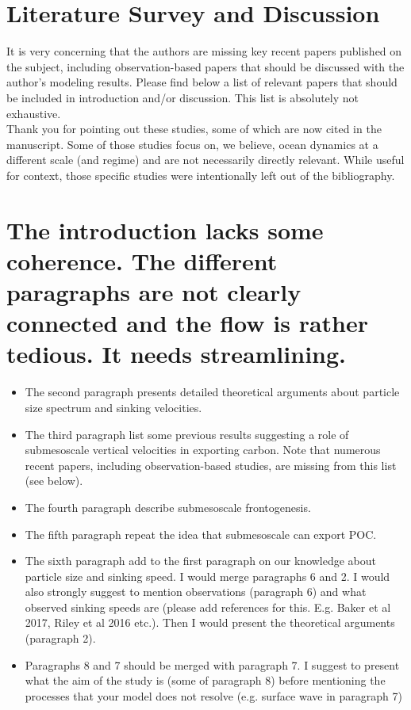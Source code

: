 \documentclass[12pt,letter]{article}
\begin{document}
\section*{Literature Survey and Discussion}
It is very concerning that the authors are missing key recent papers published on the subject, including observation-based papers that should be discussed with the author's modeling results. Please find below a list of relevant papers that should be included in introduction and/or discussion. This list is absolutely not exhaustive.\\

{\color{blue} Thank you for pointing out these studies, some of which are now cited in the manuscript. Some of those studies focus on, we believe, ocean dynamics at a different scale (and regime) and are not necessarily directly relevant. While useful for context, those specific studies were intentionally left out of the bibliography.\\}


\section*{The introduction lacks some coherence. The different paragraphs are not clearly connected and the flow is rather tedious. It needs streamlining. }
\begin{itemize}
	\item	The second paragraph presents detailed theoretical arguments about particle size spectrum and sinking velocities.
	\item	The third paragraph list some previous results suggesting a role of submesoscale vertical velocities in exporting carbon. Note that numerous recent papers, including observation-based studies, are missing from this list (see below).
	\item	The fourth paragraph describe submesoscale frontogenesis.
	\item	The fifth paragraph repeat the idea that submesoscale can export POC.
	\item	The sixth paragraph add to the first paragraph on our knowledge about particle size and sinking speed. I would merge paragraphs 6 and 2. I would also strongly suggest to mention observations (paragraph 6) and what observed sinking speeds are (please add references for this. E.g. Baker et al 2017, Riley et al 2016 etc.). Then I would present the theoretical arguments (paragraph 2).
	\item	Paragraphs 8 and 7 should be merged with paragraph 7. I suggest to present what the aim of the study is (some of paragraph 8) before mentioning the processes that your model does not resolve (e.g. surface wave in paragraph 7)
\end{itemize}
\end{document}
